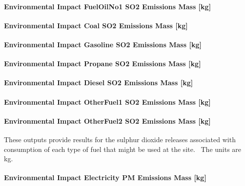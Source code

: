\paragraph{Environmental Impact FuelOilNo1 SO2 Emissions Mass {[}kg{]}}\label{environmental-impact-fuel-oil-1-so2-emissions-mass-kg}

\paragraph{Environmental Impact Coal SO2 Emissions Mass {[}kg{]}}\label{environmental-impact-coal-so2-emissions-mass-kg}

\paragraph{Environmental Impact Gasoline SO2 Emissions Mass {[}kg{]}}\label{environmental-impact-gasoline-so2-emissions-mass-kg}

\paragraph{Environmental Impact Propane SO2 Emissions Mass {[}kg{]}}\label{environmental-impact-propane-so2-emissions-mass-kg}

\paragraph{Environmental Impact Diesel SO2 Emissions Mass {[}kg{]}}\label{environmental-impact-diesel-so2-emissions-mass-kg}

\paragraph{Environmental Impact OtherFuel1 SO2 Emissions Mass {[}kg{]}}\label{environmental-impact-otherfuel1-so2-emissions-mass-kg}

\paragraph{Environmental Impact OtherFuel2 SO2 Emissions Mass {[}kg{]}}\label{environmental-impact-otherfuel2-so2-emissions-mass-kg}

These outputs provide results for the sulphur dioxide releases associated with consumption of each type of fuel that might be used at the site.~ The units are kg.

\paragraph{Environmental Impact Electricity PM Emissions Mass {[}kg{]}}\label{environmental-impact-electricity-pm-emissions-mass-kg}

